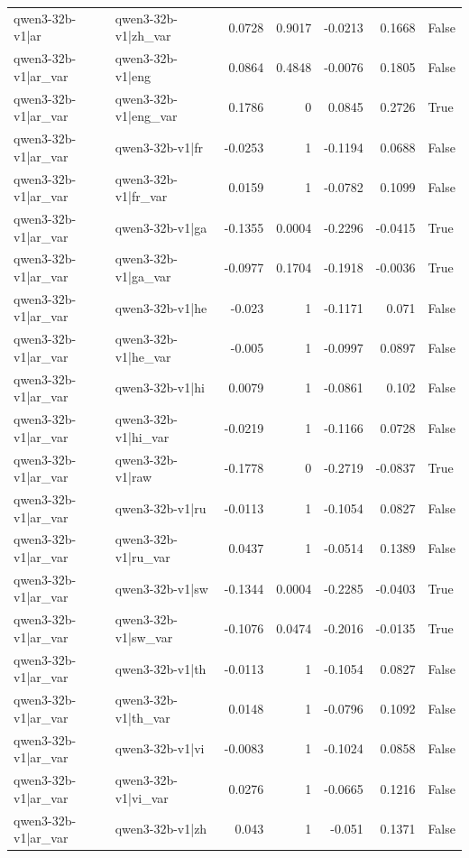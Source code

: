 \begin{table}
\begin{tabular}{l l r r r r l}
qwen3-32b-v1|ar & qwen3-32b-v1|zh_var & 0.0728 & 0.9017 & -0.0213 & 0.1668 & False \\
qwen3-32b-v1|ar_var & qwen3-32b-v1|eng & 0.0864 & 0.4848 & -0.0076 & 0.1805 & False \\
qwen3-32b-v1|ar_var & qwen3-32b-v1|eng_var & 0.1786 & 0 & 0.0845 & 0.2726 & True \\
qwen3-32b-v1|ar_var & qwen3-32b-v1|fr & -0.0253 & 1 & -0.1194 & 0.0688 & False \\
qwen3-32b-v1|ar_var & qwen3-32b-v1|fr_var & 0.0159 & 1 & -0.0782 & 0.1099 & False \\
qwen3-32b-v1|ar_var & qwen3-32b-v1|ga & -0.1355 & 0.0004 & -0.2296 & -0.0415 & True \\
qwen3-32b-v1|ar_var & qwen3-32b-v1|ga_var & -0.0977 & 0.1704 & -0.1918 & -0.0036 & True \\
qwen3-32b-v1|ar_var & qwen3-32b-v1|he & -0.023 & 1 & -0.1171 & 0.071 & False \\
qwen3-32b-v1|ar_var & qwen3-32b-v1|he_var & -0.005 & 1 & -0.0997 & 0.0897 & False \\
qwen3-32b-v1|ar_var & qwen3-32b-v1|hi & 0.0079 & 1 & -0.0861 & 0.102 & False \\
qwen3-32b-v1|ar_var & qwen3-32b-v1|hi_var & -0.0219 & 1 & -0.1166 & 0.0728 & False \\
qwen3-32b-v1|ar_var & qwen3-32b-v1|raw & -0.1778 & 0 & -0.2719 & -0.0837 & True \\
qwen3-32b-v1|ar_var & qwen3-32b-v1|ru & -0.0113 & 1 & -0.1054 & 0.0827 & False \\
qwen3-32b-v1|ar_var & qwen3-32b-v1|ru_var & 0.0437 & 1 & -0.0514 & 0.1389 & False \\
qwen3-32b-v1|ar_var & qwen3-32b-v1|sw & -0.1344 & 0.0004 & -0.2285 & -0.0403 & True \\
qwen3-32b-v1|ar_var & qwen3-32b-v1|sw_var & -0.1076 & 0.0474 & -0.2016 & -0.0135 & True \\
qwen3-32b-v1|ar_var & qwen3-32b-v1|th & -0.0113 & 1 & -0.1054 & 0.0827 & False \\
qwen3-32b-v1|ar_var & qwen3-32b-v1|th_var & 0.0148 & 1 & -0.0796 & 0.1092 & False \\
qwen3-32b-v1|ar_var & qwen3-32b-v1|vi & -0.0083 & 1 & -0.1024 & 0.0858 & False \\
qwen3-32b-v1|ar_var & qwen3-32b-v1|vi_var & 0.0276 & 1 & -0.0665 & 0.1216 & False \\
qwen3-32b-v1|ar_var & qwen3-32b-v1|zh & 0.043 & 1 & -0.051 & 0.1371 & False \\

\end{tabular}
\end{table}
